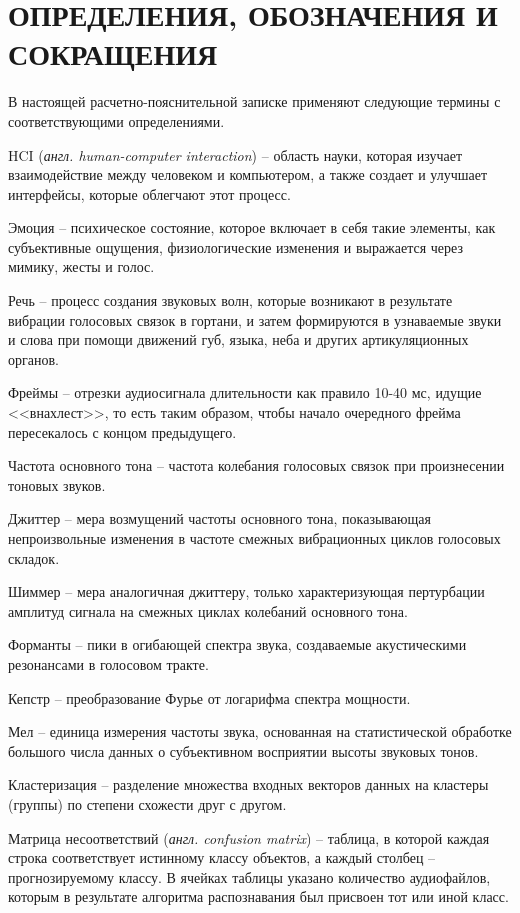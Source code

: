 \part*{ОПРЕДЕЛЕНИЯ, ОБОЗНАЧЕНИЯ И\\СОКРАЩЕНИЯ}
В настоящей расчетно-пояснительной записке применяют следующие термины с соответствующими определениями.

\begin{enumdescript}
	\item[HCI] (\textit{англ. human-computer interaction}) -- область науки, которая изучает взаимодействие между человеком и компьютером, а также создает и улучшает интерфейсы, которые облегчают этот процесс. 
	\item[Эмоция] -- психическое состояние, которое включает в себя такие элементы, как субъективные ощущения, физиологические изменения и выражается через мимику, жесты и голос. 
	\item[Речь] -- процесс создания звуковых волн, которые возникают в результате вибрации голосовых связок в гортани, и затем формируются в узнаваемые звуки и слова при помощи движений губ, языка, неба и других артикуляционных органов.
	\item[Фреймы] -- отрезки аудиосигнала длительности как правило 10-40 мс, идущие <<внахлест>>, то есть таким
	образом, чтобы начало очередного фрейма пересекалось с концом предыдущего. 
	\item[Частота основного тона] -- частота колебания голосовых связок при произнесении тоновых звуков.
	\item[Джиттер] -- мера возмущений частоты основного тона, показывающая непроизвольные изменения в частоте смежных вибрационных циклов голосовых складок.
	\item[Шиммер] -- мера аналогичная джиттеру, только характеризующая пертурбации амплитуд сигнала на смежных циклах колебаний основного тона.
	\item[Форманты] --  пики в огибающей спектра звука, создаваемые акустическими резонансами в голосовом тракте. 
	\item[Кепстр] -- преобразование Фурье от логарифма спектра мощности.
	\item[Мел] -- единица измерения частоты звука, основанная на статистической обработке большого числа данных о субъективном восприятии высоты звуковых тонов.
	\item[Кластеризация] -- разделение множества входных векторов данных на кластеры (группы) по степени схожести друг с другом.
	\item [Матрица несоответствий] (\textit{англ. confusion matrix}) -- таблица, в которой каждая строка соответствует истинному классу объектов, а каждый столбец -- прогнозируемому классу. В ячейках таблицы указано количество аудиофайлов, которым в результате алгоритма распознавания был присвоен тот или иной класс.
\end{enumdescript}
